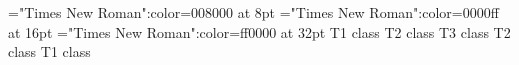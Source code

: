 \font\tctbta="Times New Roman":color=008000 at 8pt
\font\tbta="Times New Roman":color=0000ff at 16pt
\font\ta="Times New Roman":color=ff0000 at 32pt
\ta T1 class 
\tbta T2 class \tctbta T3 class \tbta T2 class \ta T1 class 

\bye
